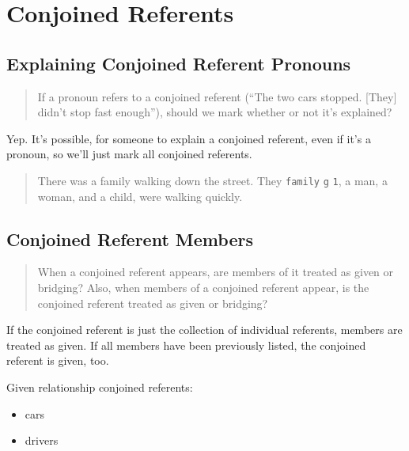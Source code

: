 \documentclass[
]{book}
\providecommand{\tightlist}{%
  \setlength{\itemsep}{0pt}\setlength{\parskip}{0pt}}
\begin{document}
\hypertarget{conjoined-referents}{%
\section{Conjoined Referents}\label{conjoined-referents}}

\hypertarget{explaining-conjoined-referent-pronouns}{%
\subsection{Explaining Conjoined Referent Pronouns}\label{explaining-conjoined-referent-pronouns}}

\begin{quote}
If a pronoun refers to a conjoined referent (``The two cars stopped. {[}They{]} didn't stop fast enough''),
should we mark whether or not it's explained?
\end{quote}

Yep.
It's possible, for someone to explain a conjoined referent, even if it's a pronoun, so we'll just mark all conjoined referents.

\begin{quote}
There was a family walking down the street.
They \texttt{family} \texttt{g} \texttt{1}, a man, a woman, and a child, were walking quickly.
\end{quote}

\hypertarget{conjoined-referent-members}{%
\subsection{Conjoined Referent Members}\label{conjoined-referent-members}}

\begin{quote}
When a conjoined referent appears, are members of it treated as given or bridging?
Also, when members of a conjoined referent appear, is the conjoined referent treated as given or bridging?
\end{quote}

If the conjoined referent is just the collection of individual referents, members are treated as given.
If all members have been previously listed, the conjoined referent is given, too.

Given relationship conjoined referents:

\begin{itemize}
\tightlist
\item
  cars
\item
  drivers
\end{itemize}
\end{document}
